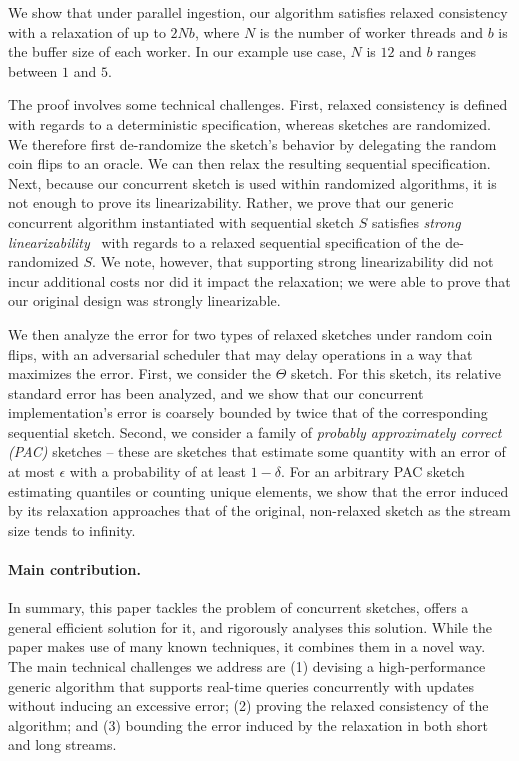 We show that under parallel ingestion, our algorithm satisfies relaxed consistency with a relaxation of up to $2Nb$, where $N$ is the number of worker threads and $b$ is the buffer size of each worker.  
In our example use case, $N$ is $12$ and $b$ ranges between $1$ and $5$. 

The proof involves some technical challenges. First, relaxed consistency is defined with regards to a deterministic specification, whereas sketches are randomized.
We therefore first de-randomize the sketch's behavior
by delegating the random coin flips to an oracle. We can then relax the resulting sequential specification.
Next, because our concurrent sketch is used within randomized algorithms, 
it is not enough to prove its linearizability. Rather, 
we prove that our generic concurrent algorithm instantiated with sequential sketch $S$
satisfies \emph{strong linearizability}~\cite{Wojciech} with regards to a relaxed sequential specification of the de-randomized $S$. We note, however, that supporting strong linearizability
did not incur additional costs nor did it impact the relaxation; we were able to prove that our original design was strongly linearizable. 

We then analyze the error for two types of relaxed sketches under random coin flips, with an adversarial scheduler that may delay operations in a way that maximizes the error. First, we consider the $\Theta$ sketch. For this sketch, its relative standard error has been analyzed, and we
show  that our concurrent implementation's error is coarsely bounded by twice
that of the corresponding sequential sketch. Second, we consider a family of \emph{probably approximately correct (PAC)}
sketches -- these are sketches that estimate some quantity with an error of at most $\epsilon$ with a probability of at least $1-\delta$. 
For an arbitrary PAC sketch estimating quantiles or counting unique elements, we show that the error induced by its relaxation approaches that of the original, non-relaxed sketch as the stream size tends to infinity.

\paragraph{Main contribution.} In summary, this paper tackles the problem of concurrent sketches,
offers a general efficient solution for it, and rigorously analyses this solution. While the
paper makes use of many known techniques, it combines them in a novel way.
The main technical challenges we address are (1) devising a high-performance generic algorithm 
that supports real-time queries concurrently with updates without inducing an excessive error; 
(2) proving the relaxed consistency of the algorithm; 
and (3) bounding the error induced by the relaxation in both short and long streams.

